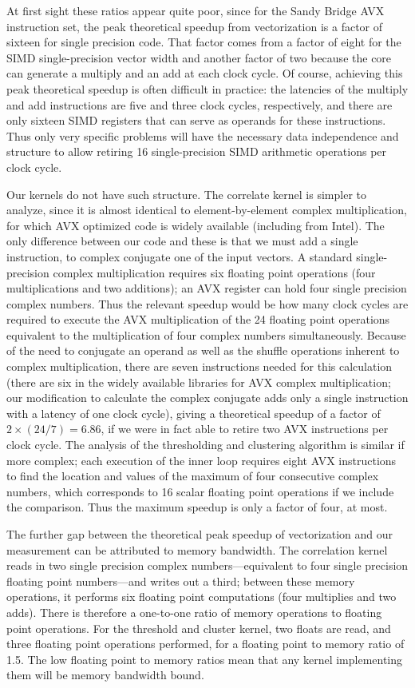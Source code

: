 At first sight these ratios appear quite poor, since for the Sandy Bridge AVX
instruction set, the peak theoretical speedup from 
vectorization is a factor of sixteen for single precision code.  That factor
comes from a factor of eight for the SIMD single-precision vector width and
another factor of two because the core can generate a multiply and an add at
each clock cycle.  Of course, achieving this peak theoretical speedup is often
difficult in practice: the latencies of the multiply and add instructions are
five and three clock cycles, respectively, and there are only sixteen SIMD
registers that can serve as operands for these instructions. Thus only very
specific problems will have the necessary data independence and structure to
allow retiring 16 single-precision SIMD arithmetic operations per clock cycle.

Our kernels do not have such structure.  The correlate kernel is simpler to
analyze, since it is almost identical to element-by-element complex
multiplication, for which AVX optimized code is widely available (including from
Intel). The only difference between our code and these is that we must add a
single instruction, to complex conjugate one of the input vectors. A standard
single-precision complex multiplication requires six floating point operations
(four multiplications and two additions); an AVX register can hold four single
precision complex numbers. Thus the relevant speedup would be how many clock
cycles are required to execute the AVX multiplication of the 24 floating point
operations equivalent to the multiplication of four complex numbers
simultaneously. Because of the need to conjugate an operand as well as the
shuffle operations inherent to complex multiplication, there are seven
instructions needed for this calculation (there are six in the widely available
libraries for AVX complex multiplication; our modification to calculate the
complex conjugate adds only a single instruction with a latency of one clock
cycle),  giving a theoretical speedup of a factor of $2\times (24/7) = 6.86$, if
we were in fact able to retire two AVX instructions per clock cycle. The
analysis of the thresholding and clustering algorithm is similar if more
complex; each execution of the inner loop requires eight AVX instructions to
find the location and values of the maximum of four consecutive complex numbers,
which corresponds to 16 scalar floating point operations if we include the
comparison. Thus the maximum speedup is only a factor of four, at most. 

The further gap between the theoretical peak speedup of vectorization and our measurement can be attributed to memory bandwidth. The correlation kernel
reads in two single precision complex numbers---equivalent to four single
precision floating point numbers---and writes out a third; between these memory
operations, it performs six floating point computations (four multiplies and two
adds). There is therefore a one-to-one ratio of memory operations to floating
point operations.  For the threshold and cluster kernel, two floats are read,
and three floating point operations performed, for a floating point to memory
ratio of 1.5. The low floating point to memory ratios mean that any kernel
implementing them will be memory bandwidth bound.

